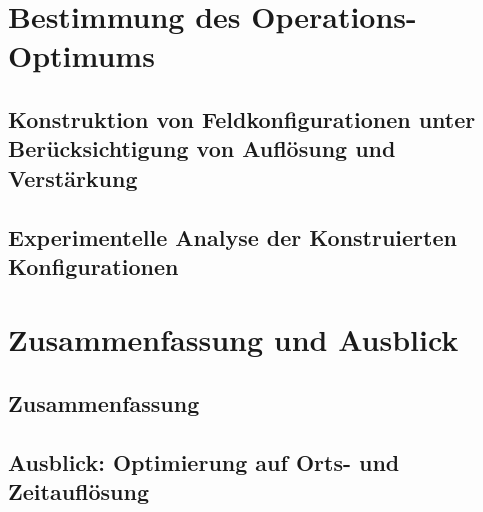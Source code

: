	
\chapter{Bestimmung des Operations-Optimums}
	\section{Konstruktion von Feldkonfigurationen unter Berücksichtigung von Auflösung und Verstärkung}
	
	\section{Experimentelle Analyse der Konstruierten Konfigurationen}
	
\chapter{Zusammenfassung und Ausblick}
	\section{Zusammenfassung}
	
	\section{Ausblick: Optimierung auf Orts- und Zeitauflösung}		
